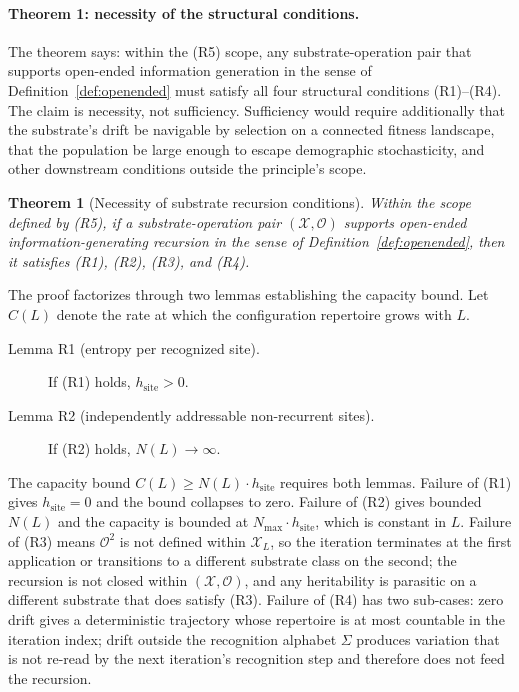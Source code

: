 \documentclass[aps,prx,reprint,amsmath,amssymb,floatfix,superscriptaddress,nofootinbib]{revtex4-2}
\theoremstyle{plain-thm}
\newtheorem{theorem}{Theorem}
\theoremstyle{definition-thm}
\newcommand{\Xset}{\mathcal{X}}
\newcommand{\Op}{\mathcal{O}}
\begin{document}
\paragraph{Theorem 1: necessity of the structural conditions.}

The theorem says: within the (R5) scope, any substrate-operation pair that supports open-ended information generation in the sense of Definition~\ref{def:openended} must satisfy all four structural conditions (R1)--(R4). The claim is necessity, not sufficiency. Sufficiency would require additionally that the substrate's drift be navigable by selection on a connected fitness landscape, that the population be large enough to escape demographic stochasticity, and other downstream conditions outside the principle's scope.

\begin{theorem}[Necessity of substrate recursion conditions]
\label{thm:necessity}
Within the scope defined by \textnormal{(R5)}, if a substrate-operation pair $(\Xset, \Op)$ supports open-ended information-generating recursion in the sense of Definition~\ref{def:openended}, then it satisfies \textnormal{(R1)}, \textnormal{(R2)}, \textnormal{(R3)}, and \textnormal{(R4)}.
\end{theorem}

The proof factorizes through two lemmas establishing the capacity bound. Let $C(L)$ denote the rate at which the configuration repertoire grows with $L$.

\begin{description}
\item[Lemma R1 (entropy per recognized site).] If (R1) holds, $h_{\mathrm{site}} > 0$.
\item[Lemma R2 (independently addressable non-recurrent sites).] If (R2) holds, $N(L) \to \infty$.
\end{description}

The capacity bound $C(L) \ge N(L) \cdot h_{\mathrm{site}}$ requires both lemmas. Failure of (R1) gives $h_{\mathrm{site}} = 0$ and the bound collapses to zero. Failure of (R2) gives bounded $N(L)$ and the capacity is bounded at $N_{\max} \cdot h_{\mathrm{site}}$, which is constant in $L$. Failure of (R3) means $\Op^2$ is not defined within $\Xset_L$, so the iteration terminates at the first application or transitions to a different substrate class on the second; the recursion is not closed within $(\Xset, \Op)$, and any heritability is parasitic on a different substrate that does satisfy (R3). Failure of (R4) has two sub-cases: zero drift gives a deterministic trajectory whose repertoire is at most countable in the iteration index; drift outside the recognition alphabet $\Sigma$ produces variation that is not re-read by the next iteration's recognition step and therefore does not feed the recursion.
\end{document}
